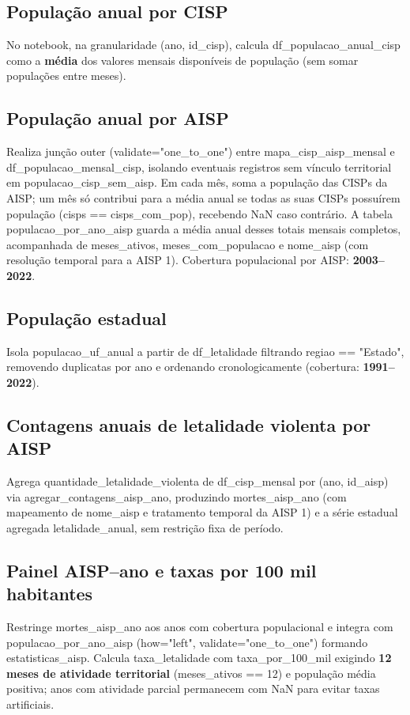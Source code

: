 \documentclass[11pt,a4paper]{article}
\newcommand{\code}[1]{{\ttfamily\footnotesize\allowbreak #1}}
\begin{document}
\subsection{População anual por CISP}
No notebook, na granularidade \code{(ano, id\_cisp)}, calcula \code{df\_populacao\_anual\_cisp} como a \textbf{média} dos valores mensais disponíveis de população (sem somar populações entre meses).

\subsection{População anual por AISP}
Realiza junção \code{outer} (\code{validate="one\_to\_one"}) entre \code{mapa\_cisp\_aisp\_mensal} e \code{df\_populacao\_mensal\_cisp}, isolando eventuais registros sem vínculo territorial em \code{populacao\_cisp\_sem\_aisp}. Em cada mês, soma a população das CISPs da AISP; um mês só contribui para a média anual se todas as suas CISPs possuírem população (\code{cisps == cisps\_com\_pop}), recebendo \code{NaN} caso contrário. A tabela \code{populacao\_por\_ano\_aisp} guarda a média anual desses totais mensais completos, acompanhada de \code{meses\_ativos}, \code{meses\_com\_populacao} e \code{nome\_aisp} (com resolução temporal para a AISP 1). Cobertura populacional por AISP: \textbf{2003--2022}.

\subsection{População estadual}
Isola \code{populacao\_uf\_anual} a partir de \code{df\_letalidade} filtrando \code{regiao == "Estado"}, removendo duplicatas por \code{ano} e ordenando cronologicamente (cobertura: \textbf{1991--2022}).

\subsection{Contagens anuais de letalidade violenta por AISP}
Agrega \code{quantidade\_letalidade\_violenta} de \code{df\_cisp\_mensal} por \code{(ano, id\_aisp)} via \code{agregar\_contagens\_aisp\_ano}, produzindo \code{mortes\_aisp\_ano} (com mapeamento de \code{nome\_aisp} e tratamento temporal da AISP 1) e a série estadual agregada \code{letalidade\_anual}, sem restrição fixa de período.

\subsection{Painel AISP--ano e taxas por 100 mil habitantes}
Restringe \code{mortes\_aisp\_ano} aos anos com cobertura populacional e integra com \code{populacao\_por\_ano\_aisp} (\code{how="left", validate="one\_to\_one"}) formando \code{estatisticas\_aisp}. Calcula \code{taxa\_letalidade} com \code{taxa\_por\_100\_mil} exigindo \textbf{12 meses de atividade territorial} (\code{meses\_ativos == 12}) e população média positiva; anos com atividade parcial permanecem com \code{NaN} para evitar taxas artificiais.
\end{document}
